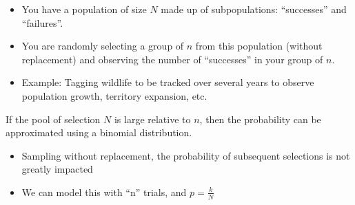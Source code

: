 \begin{itemize}
    \item You have a population of size $N$ made up of subpopulations: ``successes'' and ``failures''. 
    \item You are randomly selecting a group of $n$ from this population (without replacement) and observing the number of ``successes'' in your group of $n$. 
    \item Example: Tagging wildlife to be tracked over several years to observe population growth, territory expansion, etc.
\end{itemize}

If the pool of selection $N$ is large relative to $n$, then the probability can be approximated using a binomial distribution.

\begin{itemize}
    \item Sampling without replacement, the probability of subsequent selections is not greatly impacted
    \item We can model this with ``n'' trials, and $p = \frac{k}{N}$
\end{itemize}


